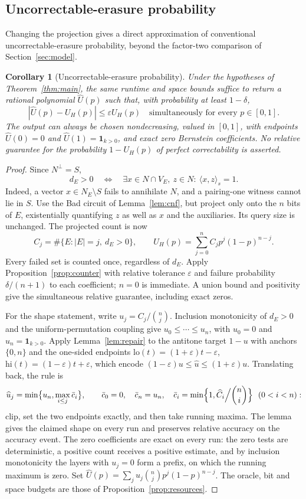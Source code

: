 \documentclass[11pt]{article}
\newtheorem{corollary}[theorem]{Corollary}
\theoremstyle{remark}
\newcommand{\eps}{\varepsilon}
\newcommand{\pair}[2]{\langle #1,#2\rangle_s}
\newcommand{\Bern}[2]{\binom{#1}{#2}p^{#2}(1-p)^{#1-#2}}
\begin{document}
\subsection{Uncorrectable-erasure probability}

Changing the projection gives a direct approximation of conventional
uncorrectable-erasure probability, beyond the factor-two comparison of
Section~\ref{sec:model}.

\begin{corollary}[Uncorrectable-erasure probability]\label{cor:uncorrectable}
Under the hypotheses of Theorem~\ref{thm:main}, the same runtime and
space bounds suffice to return a rational polynomial \(\widehat U(p)\)
such that, with probability at least \(1-\delta\),
\[
 |\widehat U(p)-U_H(p)|\le\eps U_H(p)
 \quad\text{simultaneously for every }p\in[0,1].
\]
The output can always be chosen nondecreasing, valued in \([0,1]\),
with endpoints \(\widehat U(0)=0\) and
\(\widehat U(1)=\mathbf1_{k>0}\), and exact zero Bernstein coefficients.
No relative guarantee for the probability \(1-U_H(p)\) of perfect
correctability is asserted.
\end{corollary}
\begin{proof}
Since \(N^\perp=S\),
\[
 d_E>0\quad\Longleftrightarrow\quad
 \exists x\in N\cap V_E,\ z\in N:\ \pair{x}{z}=1.
\]
Indeed, a vector \(x\in N_E\setminus S\) fails to annihilate \(N\),
and a pairing-one witness cannot lie in \(S\).
Use the Bad circuit of Lemma~\ref{lem:cnf}, but project only onto
the \(n\) bits of \(E\), existentially quantifying \(z\) as well as
\(x\) and the auxiliaries. Its query size is unchanged. The projected
count is now
\[
 C_j=\#\{E:|E|=j,\ d_E>0\},\qquad
 U_H(p)=\sum_{j=0}^n C_jp^j(1-p)^{n-j}.
\]
Every failed set is counted once, regardless of \(d_E\).
Apply Proposition~\ref{prop:counter} with relative tolerance \(\eps\)
and failure probability \(\delta/(n+1)\) to each coefficient;
\(n=0\) is immediate. A union bound and positivity give the simultaneous
relative guarantee, including exact zeros.

For the shape statement, write \(u_j=C_j/\binom nj\).
Inclusion monotonicity of \(d_E>0\) and the uniform-permutation
coupling give \(u_0\le\cdots\le u_n\), with \(u_0=0\) and
\(u_n=\mathbf1_{k>0}\). Apply Lemma~\ref{lem:repair} to the antitone
target \(1-u\) with anchors \(\{0,n\}\) and the one-sided endpoints
\(\mathrm{lo}(t)=(1+\eps)t-\eps\), \(\mathrm{hi}(t)=(1-\eps)t+\eps\),
which encode \((1-\eps)u\le\widehat u\le(1+\eps)u\). Translating back,
the rule is
\[
 \widehat u_j=\min\bigl\{u_n,\max_{i\le j}\bar c_i\bigr\},\qquad
 \bar c_0=0,\quad \bar c_n=u_n,\quad
 \bar c_i=\min\Bigl\{1,\widehat C_i\Big/\binom ni\Bigr\}\ \ (0<i<n):
\]
clip, set the two endpoints exactly, and then take running maxima. The
lemma gives the claimed shape on every run and preserves relative
accuracy on the accuracy event. The zero coefficients are exact on every
run: the zero tests are deterministic, a positive count receives a
positive estimate, and by inclusion monotonicity the layers with
\(u_j=0\) form a prefix, on which the running maximum is zero. Set \(\widehat U(p)=\sum_j\widehat u_j\Bern{n}{j}\). The oracle,
bit and space budgets are those of Proposition~\ref{prop:resources}.
\end{proof}
\end{document}
